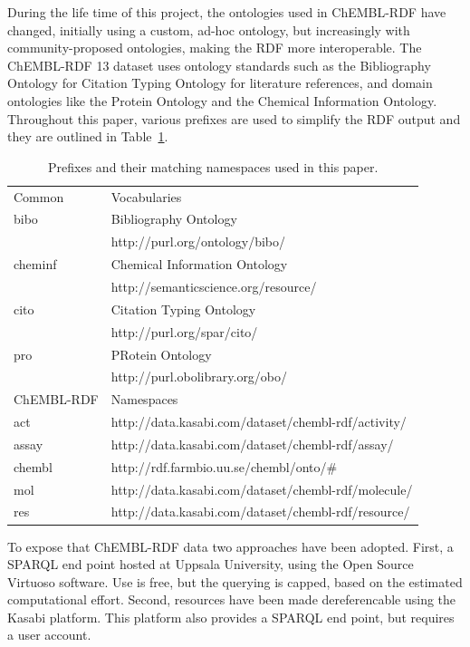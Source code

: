 \documentclass[sw]{iosart2c}
\begin{document}
During the life time of this project, the ontologies used in ChEMBL-RDF have changed,
initially using a custom, ad-hoc ontology, but increasingly with community-proposed
ontologies, making the RDF more interoperable. The ChEMBL-RDF 13 dataset uses ontology
standards such as the Bibliography Ontology for Citation Typing Ontology for literature
references, and domain ontologies like the Protein Ontology and the Chemical Information
Ontology. Throughout this paper, various prefixes are used to simplify the RDF output and they are outlined
in Table~\ref{namespaces}.

\begin{table}
\caption{Prefixes and their matching namespaces used in this paper.} \label{namespaces}
\begin{tabular}{ll}
\hline
Common & Vocabularies \\
bibo    & Bibliography Ontology~\cite{Giasson2011} \\
        & http://purl.org/ontology/bibo/ \\
cheminf & Chemical Information Ontology~\cite{Hastings2011} \\
        & http://semanticscience.org/resource/ \\
cito    & Citation Typing Ontology~\cite{Shotton2010} \\
        & http://purl.org/spar/cito/ \\
pro     & PRotein Ontology~\cite{Sidhu2006} \\
        & http://purl.obolibrary.org/obo/ \\

\hline
ChEMBL-RDF & Namespaces\\
act    & http://data.kasabi.com/dataset/chembl-rdf/activity/ \\
assay  & http://data.kasabi.com/dataset/chembl-rdf/assay/ \\
chembl & http://rdf.farmbio.uu.se/chembl/onto/\# \\
mol    & http://data.kasabi.com/dataset/chembl-rdf/molecule/ \\
res    & http://data.kasabi.com/dataset/chembl-rdf/resource/ \\
\hline
\end{tabular}
\end{table}

To expose that ChEMBL-RDF data two approaches have been adopted. First, a SPARQL end point
hosted at Uppsala University, using the Open Source Virtuoso software. Use is free, but the
querying is capped, based on the estimated computational effort. Second, resources have
been made dereferencable using the Kasabi platform. This platform also provides a SPARQL
end point, but requires a user account.
\end{document}
